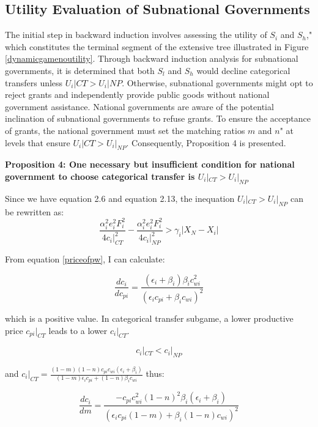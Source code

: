 \begin{itemize}
\subsection{Utility Evaluation of Subnational Governments}

The initial step in backward induction involves assessing the utility of $S_i$ and $S_h$," which constitutes the terminal segment of the extensive tree illustrated in Figure \ref{dynamicgamenoutility}. Through backward induction analysis for subnational governments, it is determined that both $S_l$ and $S_h$ would decline categorical transfers unless $U_i|{CT}>U_i|{NP}$. Otherwise, subnational governments might opt to reject grants and independently provide public goods without national government assistance. National governments are aware of the potential inclination of subnational governments to refuse grants. To ensure the acceptance of grants, the national government must set the matching ratios $m$ and $n$" at levels that ensure $U_i|{CT} > U_i|_{NP}$. Consequently, Proposition 4 is presented.%

\textbf{Proposition 4: One necessary but insufficient condition for national government to choose categorical transfer is $U_i|_{CT} > U_i|_{NP}$}

Since we have equation 2.6 and equation 2.13, the inequation $U_i|_{CT} > U_i|_{NP}$ can be rewritten as:
\begin{equation}
  \frac{\alpha_i^2 e_i^2 F_i^2}{4c_i|_{CT}^2}-\frac{\alpha_i^2 e_i^2 F_i^2}{4c_i|_{NP}^2} > \gamma_i|X_N-X_i| \label{ctunpu}
\end{equation}

From equation \ref{priceofpw}, I can calculate:

\begin{equation}
  \frac{dc_i}{dc_{pi}}=\frac{(\epsilon_i+\beta_i)\beta_i c_{wi}^2}{(\epsilon_ic_{pi}+\beta_i c_{wi})^2}\label{dcipi}
\end{equation}

which is a positive value. In categorical transfer subgame, a lower productive price $c_{pi}|_{CT}$ leads to a lower $c_i|_{CT}$.

\begin{equation}
  c_{i}|_{CT}<c_i|_{NP}\label{ctpnpp}
\end{equation}

and $c_i|_{CT}= \frac{(1-m)(1-n)c_{pi}c_{wi}(\epsilon_i+\beta_i)}{(1-m)\epsilon_i c_{pi} +(1-n)\beta_i c_{wi}}$ thus:

\begin{equation}
  \frac{dc_i}{dm}=\frac{-c_{pi}c_{wi}^2(1-n)^2\beta_i(\epsilon_i+\beta_i)}{(\epsilon_i c_{pi} (1-m)+\beta_i(1-n) c_{wi})^2}\label{dcim}
\end{equation}


\end{itemize}
